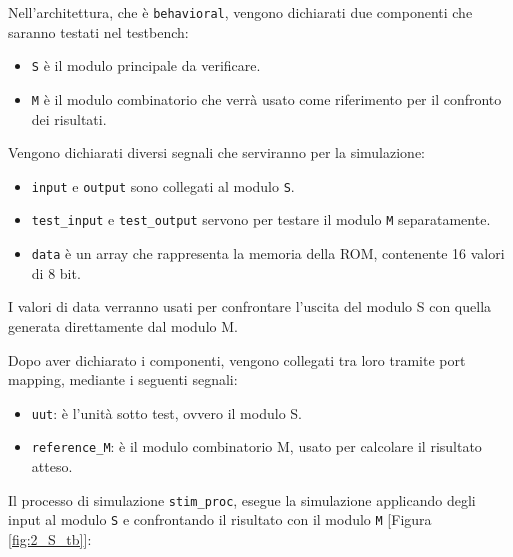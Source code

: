 Nell’architettura, che è \texttt{behavioral}, vengono dichiarati due componenti che saranno testati nel testbench:

\begin{itemize}
    \item \texttt{S} è il modulo principale da verificare.
    \item \texttt{M} è il modulo combinatorio che verrà usato come riferimento per il confronto dei risultati.
\end{itemize}

Vengono dichiarati diversi segnali che serviranno per la simulazione:

\begin{itemize}
    \item \texttt{input} e \texttt{output} sono collegati al modulo \texttt{S}.
    \item \texttt{test\_input} e \texttt{test\_output} servono per testare il modulo \texttt{M} separatamente.
    \item \texttt{data} è un array che rappresenta la memoria della ROM, contenente 16 valori di 8 bit.
\end{itemize}

I valori di data verranno usati per confrontare l'uscita del modulo S con quella generata direttamente dal modulo M.

Dopo aver dichiarato i componenti, vengono collegati tra loro tramite port mapping, mediante i seguenti segnali:

\begin{itemize}
    \item \texttt{uut}: è l'unità sotto test, ovvero il modulo S.
    \item \texttt{reference\_M}: è il modulo combinatorio M, usato per calcolare il risultato atteso.
\end{itemize}

Il processo di simulazione \texttt{stim\_proc}, esegue la simulazione applicando degli input al modulo \texttt{S} e confrontando il risultato con il modulo \texttt{M} [Figura \ref{fig:2_S_tb}]:

